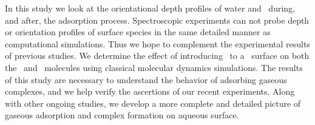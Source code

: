 In this study we look at the orientational depth profiles of water and \suldiox~during, and after, the adsorption process. Spectroscopic experiments can not probe depth or orientation profiles of surface species in the same detailed manner as computational simulations. Thus we hope to complement the experimental results of previous studies. We determine the effect of introducing \suldiox~to a \wat~surface on both the \suldiox~and \wat~molecules using classical molecular dynamics simulations. The results of this study are necessary to understand the behavior of adsorbing gaseous complexes, and we help verify the ascertions of our recent experiments. Along with other ongoing studies, we develop a more complete and detailed picture of gaseous adsorption and complex formation on aqueous surface.
